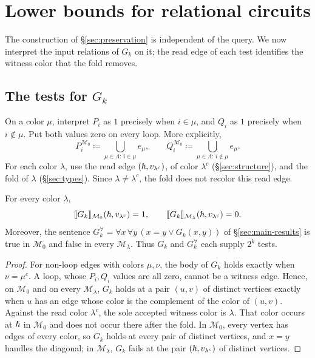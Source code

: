 \section{Lower bounds for relational circuits}\label{sec:logical}
The construction of \S\ref{sec:preservation} is independent of the
query. We now interpret the input relations of $G_k$ on it; the read
edge of each test identifies the witness color that the fold removes.

\subsection{The tests for \texorpdfstring{$G_k$}{Gk}}\label{sec:G}
On a color $\mu$, interpret $P_i$ as $1$ precisely when $i\in\mu$, and
$Q_i$ as $1$ precisely when $i\notin\mu$. Put both values zero on every
loop. More explicitly,
\[
 P_i^{\mathcal M_0}\coloneqq\bigcup_{\mu\in\Lambda:\,i\in\mu}e_\mu,\qquad
 Q_i^{\mathcal M_0}\coloneqq\bigcup_{\mu\in\Lambda:\,i\notin\mu}e_\mu.
\]
For each color $\lambda$, use the read edge $(\hslash,v_{\lambda^c})$,
of color $\lambda^c$ (\S\ref{sec:structure}), and the fold of $\lambda$
(\S\ref{sec:types}). Since $\lambda\ne\lambda^c$, the fold does not
recolor this read edge.

\begin{lemma}\label{lem:G-tests}
For every color $\lambda$,
\[
 \llbracket G_k\rrbracket_{\mathcal M_0}(\hslash,v_{\lambda^c})=1,\qquad
 \llbracket G_k\rrbracket_{\mathcal M_\lambda}(\hslash,v_{\lambda^c})=0.
\]
Moreover, the sentence $G_k^\forall=\forall x\,\forall y\,(x=y\lor
G_k(x,y))$ of \S\ref{sec:main-results} is true in $\mathcal M_0$
and false in every $\mathcal M_\lambda$. Thus $G_k$ and $G_k^\forall$
each supply $2^k$ tests.
\end{lemma}
\begin{proof}
For non-loop edges with colors $\mu,\nu$, the body of $G_k$ holds
exactly when $\nu=\mu^c$. A loop, whose $P_i,Q_i$ values are all zero,
cannot be a witness edge. Hence, on $\mathcal M_0$ and on every
$\mathcal M_\lambda$, $G_k$ holds at a pair $(u,v)$ of distinct vertices
exactly when $u$ has an edge whose color is the complement of the color
of $(u,v)$. Against the read color $\lambda^c$, the sole accepted
witness color is $\lambda$. That color occurs at $\hslash$ in
$\mathcal M_0$ and does not occur there after the fold. In
$\mathcal M_0$, every vertex has edges of every color, so $G_k$ holds at
every pair of distinct vertices, and $x=y$ handles the diagonal; in
$\mathcal M_\lambda$, $G_k$ fails at the pair $(\hslash,v_{\lambda^c})$ of
distinct vertices.
\end{proof}

